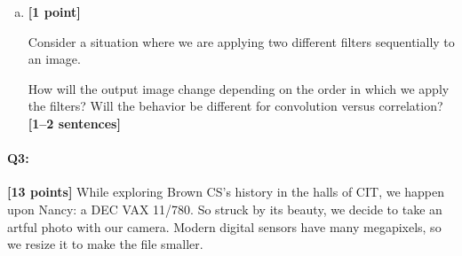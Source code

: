 \documentclass[11pt]{article}
\begin{document}
\begin{enumerate}[(a)]

\pagebreak

    \item \textbf{[1 point]} 
    \begin{tcolorbox}[colback=orange!5!white,colframe=orange!75!black]
    Consider a situation where we are applying two different filters sequentially to an image.
    
    How will the output image change depending on the order in which we apply the filters? Will the behavior be different for convolution versus correlation? \textbf{[1--2 sentences]}
    \end{tcolorbox}


\end{enumerate}


\pagebreak

\paragraph{Q3:} \textbf{[13 points]} While exploring Brown CS's history in the halls of CIT, we happen upon Nancy: a DEC VAX 11/780. So struck by its beauty, we decide to take an artful photo with our camera. Modern digital sensors have many megapixels, so we resize it to make the file smaller.
\end{document}
